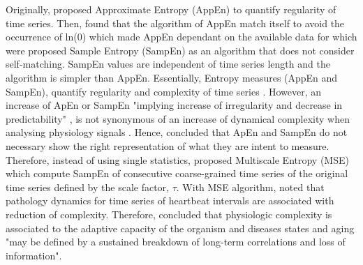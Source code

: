 Originally, \cite{pincus1991, pincus1995} proposed Approximate Entropy (AppEn) to 
quantify regularity of time series.
Then, \cite{richman2000} found that 
the algorithm of AppEn match itself to avoid the occurrence of ln(0)
which made AppEn dependant on the available data
for which were proposed Sample Entropy (SampEn) as an algorithm that 
does not consider self-matching. 
SampEn values are independent of time series length and the algorithm is simpler than AppEn.
Essentially, Entropy measures (AppEn and SampEn), 
quantify regularity and complexity of time series \citep{preatoni2013}.
However, an increase of ApEn or SampEn "implying increase of irregularity and decrease in predictability" 
\cite[p. 25]{goldberger2002b}, 
is not synonymous 
of an increase of dynamical complexity when analysing physiology signals 
\citep{costa2002}.
Hence, \cite{goldberger2002b, vaillancourt2002, costa2002} concluded that
ApEn and SampEn
do not necessary show the right representation of what they are intent to measure. 
Therefore, instead of using single statistics, \cite{costa2002} proposed Multiscale Entropy (MSE)
which compute SampEn of consecutive coarse-grained time series of the original time series
defined by the scale factor, $\tau$.
With MSE algorithm, \citep{costa2002} noted that 
pathology dynamics for time series of heartbeat intervals 
are associated with reduction of complexity.
Therefore, \cite[p. 3]{costa2002} concluded that physiologic complexity 
is associated to the adaptive capacity of the organism and 
diseases states and aging "may be defined by a sustained 
 breakdown of long-term correlations and loss of information".
